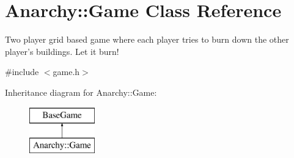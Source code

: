 \hypertarget{classAnarchy_1_1Game}{\section{Anarchy\-:\-:Game Class Reference}
\label{classAnarchy_1_1Game}
}


Two player grid based game where each player tries to burn down the other player's buildings. Let it burn!  




{\ttfamily \#include $<$game.\-h$>$}

Inheritance diagram for Anarchy\-:\-:Game\-:\begin{figure}[H]
\begin{center}
\leavevmode
\includegraphics[height=2.000000cm]{classAnarchy_1_1Game}
\end{center}
\end{figure}
